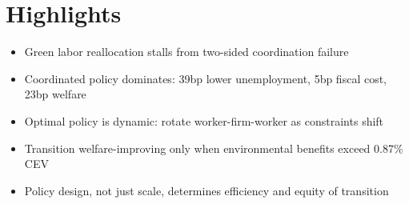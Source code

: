 \documentclass[12pt]{article}
\begin{document}
\section*{Highlights}
\begin{itemize}
  \item Green labor reallocation stalls from two-sided coordination failure
  \item Coordinated policy dominates: 39bp lower unemployment, 5bp fiscal cost, 23bp welfare
  \item Optimal policy is dynamic: rotate worker-firm-worker as constraints shift
  \item Transition welfare-improving only when environmental benefits exceed 0.87\% CEV
  \item Policy design, not just scale, determines efficiency and equity of transition
\end{itemize}
\end{document}
